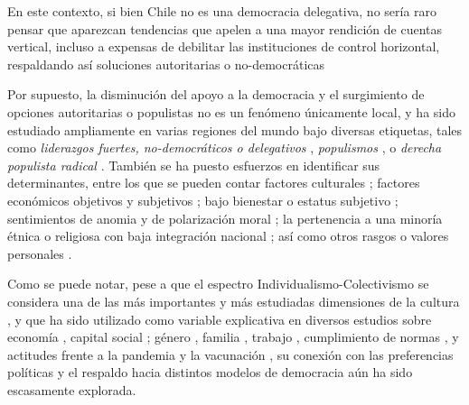 \documentclass[12pt,twoside]{templates/facsothesis}
\begin{document}
En este contexto, si bien Chile no es una democracia delegativa, no sería raro pensar que aparezcan tendencias que apelen a una mayor rendición de cuentas vertical, incluso a expensas de debilitar las instituciones de control horizontal, respaldando así soluciones autoritarias o no-democráticas \citep{carlin2018}

Por supuesto, la disminución del apoyo a la democracia y el surgimiento de opciones autoritarias o populistas no es un fenómeno únicamente local, y ha sido estudiado ampliamente en varias regiones del mundo bajo diversas etiquetas, tales como \emph{liderazgos fuertes, no-democráticos o delegativos} \citep{carlin2011, carlin2018, crimston2022, kang2018, lima2021, selvanathan2022, xuereb2021}, \emph{populismos} \citep{baro2022, gidron2020, nowakowski2021}, o \emph{derecha populista radical} \citep{diaz2023, donovan2019, donovan2021}. También se ha puesto esfuerzos en identificar sus determinantes, entre los que se pueden contar factores culturales \citep{lima2021, marchlewska2022, selvanathan2022}; factores económicos objetivos y subjetivos \citep{arikan2019, rico2020, wu2019, xuereb2021}; bajo bienestar o estatus subjetivo \citep{gidron2020, nowakowski2021}; sentimientos de anomia y de polarización moral \citep{crimston2022}; la pertenencia a una minoría étnica o religiosa con baja integración nacional \citep{eskelinen2020}; así como otros rasgos o valores personales \citep{baro2022, marchlewska2019, rico2020}.

Como se puede notar, pese a que el espectro Individualismo-Colectivismo se considera una de las más importantes y más estudiadas dimensiones de la cultura \citep{binder2019, fatehi2020}, y que ha sido utilizado como variable explicativa en diversos estudios sobre economía \citep{binder2019, kyriacou2016, germani2021, toikko2020}, capital social \citep{beilmann2018}; género \citep{dabiriyantehrani2022, davis2019}, familia \citep{al-hassan2021, rudy2006}, trabajo \citep{refslund2022, solis2018, stewart2020}, cumplimiento de normas \citep{varet2018, zhang2020}, y actitudes frente a la pandemia y la vacunación \citep{card2022}, su conexión con las preferencias políticas y el respaldo hacia distintos modelos de democracia aún ha sido escasamente explorada.
\end{document}

